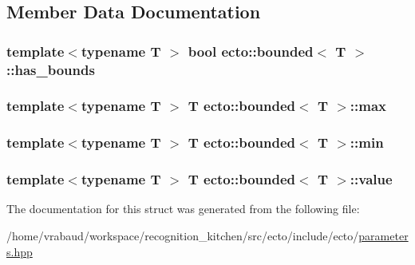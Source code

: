 \subsection{Member Data Documentation}
\subsubsection[{\texorpdfstring{has\+\_\+bounds}{has_bounds}}]{\setlength{\rightskip}{0pt plus 5cm}template$<$typename T $>$ bool {\bf ecto\+::bounded}$<$ T $>$\+::has\+\_\+bounds}\hypertarget{structecto_1_1bounded_ab7ddb1af2438b94a3563f00188d02690}{}\label{structecto_1_1bounded_ab7ddb1af2438b94a3563f00188d02690}
\subsubsection[{\texorpdfstring{max}{max}}]{\setlength{\rightskip}{0pt plus 5cm}template$<$typename T $>$ T {\bf ecto\+::bounded}$<$ T $>$\+::max}\hypertarget{structecto_1_1bounded_a8df1ae15c7a45a33bb17f8482c81418b}{}\label{structecto_1_1bounded_a8df1ae15c7a45a33bb17f8482c81418b}
\subsubsection[{\texorpdfstring{min}{min}}]{\setlength{\rightskip}{0pt plus 5cm}template$<$typename T $>$ T {\bf ecto\+::bounded}$<$ T $>$\+::min}\hypertarget{structecto_1_1bounded_a1809a5fa7b57a025107b0c12e6a293ae}{}\label{structecto_1_1bounded_a1809a5fa7b57a025107b0c12e6a293ae}
\subsubsection[{\texorpdfstring{value}{value}}]{\setlength{\rightskip}{0pt plus 5cm}template$<$typename T $>$ T {\bf ecto\+::bounded}$<$ T $>$\+::value}\hypertarget{structecto_1_1bounded_a92b4f90f8588d99f0d6d3216565c3f82}{}\label{structecto_1_1bounded_a92b4f90f8588d99f0d6d3216565c3f82}


The documentation for this struct was generated from the following file\+:\begin{DoxyCompactItemize}
\item 
/home/vrabaud/workspace/recognition\+\_\+kitchen/src/ecto/include/ecto/\hyperlink{parameters_8hpp}{parameters.\+hpp}\end{DoxyCompactItemize}
